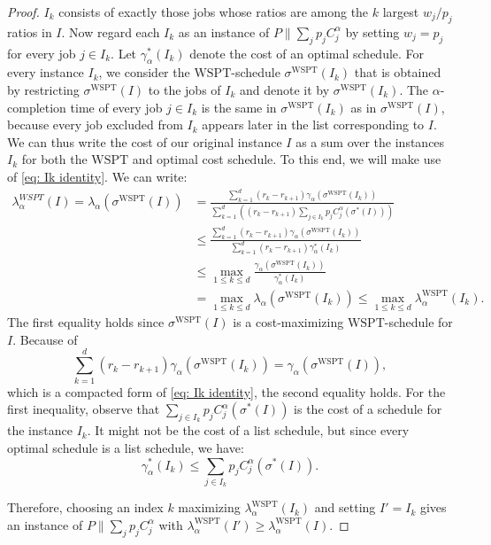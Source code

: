 \documentclass[%
english, titlepage=false %
]{./tum-templates/book/tumbook}
\newcommand{\Problem}{P\!\parallel\!\sum_j p_j C^{\alpha}_j}
\begin{document}
\begin{proof}
$I_k$ consists of exactly those jobs whose ratios are among the $k$
largest $w_j/p_j$ ratios in $I$. Now regard each $I_k$ as an instance of
$\Problem$ by setting $w_j=p_j$ for every job $j\in I_k$.
Let $\gamma^{*}_{\alpha}(I_k)$ denote the cost of an optimal schedule.
For every instance $I_k$, we consider the $\mathrm{WSPT}$-schedule $\sigma^{\mathrm{WSPT}}(I_k)$ that is obtained by restricting $\sigma^{\mathrm{WSPT}}(I)$ to the jobs of $I_k$ and denote it by $\sigma^{\mathrm{WSPT}}(I_k)$.
The $\alpha$-completion time of every job $j\in I_k$ is the same in $\sigma^{\mathrm{WSPT}}(I_k)$ as in
$\sigma^{\mathrm{WSPT}}(I)$, because every job excluded from $I_k$
appears later in the list corresponding to $I$.
We can thus write the cost of our original instance $I$ as a sum over the instances $I_k$ for both the $\mathrm{WSPT}$ and optimal
cost schedule. To this end, we will make use of \eqref{eq: Ik identity}.
We can write:
\[
\begin{aligned}
        \lambda^{WSPT}_{\alpha}(I)
        =
        \lambda_{\alpha}(\sigma^{\mathrm{WSPT}}(I))
        &=
        \frac{
        \sum_{k=1}^d (r_k-r_{k+1}) \gamma_{\alpha}(\sigma^{\mathrm{WSPT}}(I_k))
        }{
        \sum_{k=1}^d \left(
        (r_k-r_{k+1})
        \sum_{j\in I_k} p_j C_j^{\alpha}(\sigma^{*}(I))\right)
        }                                                    \\
        &\le
        \frac{
        \sum_{k=1}^d (r_k-r_{k+1}) \gamma_{\alpha}(\sigma^{\mathrm{WSPT}}(I_k))
        }{
        \sum_{k=1}^d
        (r_k-r_{k+1}) \gamma^{*}_{\alpha}(I_k)
        }                                                    \\
        &\leq
        \max_{1\leq k\leq d}
        \frac{\gamma_{\alpha}(\sigma^{\mathrm{WSPT}}(I_k))}{\gamma^{*}_{\alpha}(I_k)} \\
        &=
        \max_{1\leq k\leq d}\lambda_{\alpha}(\sigma^{\mathrm{WSPT}}(I_k))\le \max_{1\leq k\leq d}\lambda^{\mathrm{WSPT}}_{\alpha}(I_k).
\end{aligned}
\]
The first equality holds since $\sigma^{\mathrm{WSPT}}(I)$ is a cost-maximizing $\mathrm{WSPT}$-schedule for $I$.
Because of 
\[
\sum_{k=1}^d (r_k-r_{k+1}) \gamma_{\alpha}(\sigma^{\mathrm{WSPT}}(I_k)) = \gamma_{\alpha}(\sigma^{\mathrm{WSPT}}(I)),
\]
which is a compacted form of \eqref{eq: Ik identity}, the second equality holds.
For the first inequality, observe that $\sum_{j\in I_k} p_j C_j^{\alpha}(\sigma^{*}(I))$ is the cost of a schedule for the instance $I_k$. It might not be the cost of a list schedule, but since every optimal schedule 
is a list schedule, we have:
\[
\gamma^{*}_{\alpha}(I_k)
\leq
\sum_{j\in I_k}p_j C_j^{\alpha}(\sigma^{*}(I)).
\]

Therefore, choosing an index $k$ maximizing $\lambda^{\mathrm{WSPT}}_{\alpha}(I_k)$ and setting
$I'=I_k$ gives an instance of $\Problem$ with
$\lambda^{\mathrm{WSPT}}_{\alpha}(I')\geq \lambda^{\mathrm{WSPT}}_{\alpha}(I)$.



\end{proof}
\end{document}
